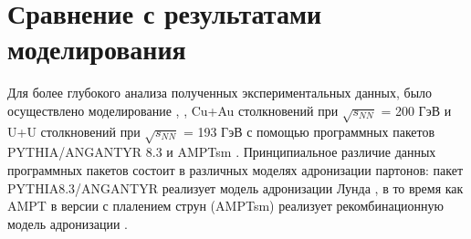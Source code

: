 \section{Сравнение с результатами моделирования} \label{sect5_spectra}

Для более глубокого анализа полученных экспериментальных данных, было осуществлено моделирование \pal, \heau, Cu+Au столкновений при $\sqrt{s_{NN}}$ = 200 ГэВ и U+U столкновений при $\sqrt{s_{NN}}$ = 193 ГэВ с помощью программных пакетов PYTHIA/ANGANTYR 8.3 \cite{pythia} и AMPTsm \cite{AMPT}.
Принципиальное различие данных программных пакетов состоит в различных моделях адронизации партонов: пакет PYTHIA8.3/ANGANTYR \cite{pythia} реализует модель адронизации Лунда \cite{FragmentationLund}, в то время как AMPT \cite{AMPT} в версии с плалением струн (AMPTsm) реализует рекомбинационную модель адронизации \cite{Recombination1, Recombination2}.

